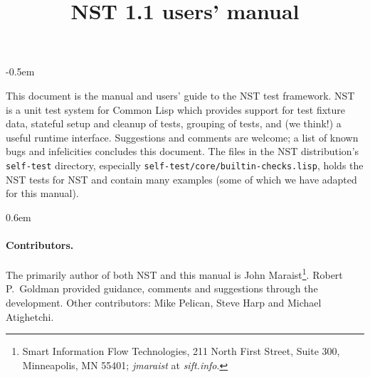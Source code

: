 \documentclass[draft]{article}
\title{NST 1.1 users' manual}
\begin{document}
\maketitle
\thispagestyle{empty}
\parskip -0.5em

\noindent This document is the manual and users' guide to the NST test
framework.  NST is a unit test system for Common Lisp which provides
support for test fixture data, stateful setup and cleanup of tests,
grouping of tests, and (we think!) a useful runtime interface.
Suggestions and comments are welcome; a list of known bugs and
infelicities concludes this document.  The files in the NST
distribution's \texttt{self-test} directory, especially
\texttt{self-test/core/builtin-checks.lisp}, holds the NST tests for
NST and contain many examples (some of which we have adapted for this
manual).

\tableofcontents
\parskip 0.6em
\parindent 0pt

\paragraph{Contributors.}
The primarily author of both NST and this manual is John
Maraist\footnote{Smart Information Flow Technologies, 211 North First
  Street, Suite 300, Minneapolis, MN 55401; \textsl{jmaraist} at
  \textsl{sift.info}.}.  Robert P.\ Goldman provided guidance,
comments and suggestions through the development.  Other contributors:
Mike Pelican, Steve Harp and Michael Atighetchi.
\cleardoublepage
{}







\appendix
{}


\printindex
\end{document}

